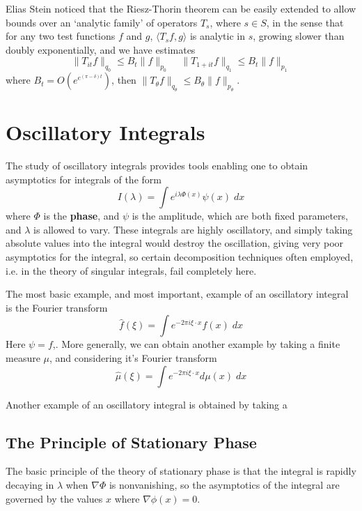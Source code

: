 Elias Stein noticed that the Riesz-Thorin theorem can be easily extended to allow bounds over an `analytic family' of operators $T_s$, where $s \in S$, in the sense that for any two test functions $f$ and $g$, $\langle T_s f, g \rangle$ is analytic in $s$, growing slower than doubly exponentially, and we have estimates
%
\[ \| T_{it} f \|_{q_0} \leq B_t \| f \|_{p_0}\ \ \ \ \ \| T_{1+it} f \|_{q_1} \leq B_t \| f \|_{p_1} \]
%
where $B_t = O(e^{e^{(\pi - \delta)t}})$, then $\| T_\theta f \|_{q_\theta} \leq B_\theta \| f \|_{p_\theta}$.

\chapter{Oscillatory Integrals}

The study of oscillatory integrals provides tools enabling one to obtain asymptotics for integrals of the form
%
\[ I(\lambda) = \int e^{i \lambda \Phi(x)} \psi(x)\; dx \]
%
where $\Phi$ is the {\bf phase}, and $\psi$ is the amplitude, which are both fixed parameters, and $\lambda$ is allowed to vary. These integrals are highly oscillatory, and simply taking absolute values into the integral would destroy the oscillation, giving very poor asymptotics for the integral, so certain decomposition techniques often employed, i.e. in the theory of singular integrals, fail completely here.

\begin{example}
	The most basic example, and most important, example of an oscillatory integral is the Fourier transform
	\[ \widehat{f}(\xi) = \int e^{- 2 \pi i \xi \cdot x} f(x)\; dx \]
	Here $\psi = f$,. More generally, we can obtain another example by taking a finite measure $\mu$, and considering it's Fourier transform
	\[ \widehat{\mu}(\xi) = \int e^{- 2\pi i \xi \cdot x} d\mu(x)\; dx \]

\end{example}

\begin{example}
	Another example of an oscillatory integral is obtained by taking a
\end{example}

\section{The Principle of Stationary Phase}

The basic principle of the theory of stationary phase is that the integral is rapidly decaying in $\lambda$ when $\nabla \Phi$ is nonvanishing, so the asymptotics of the integral are governed by the values $x$ where $\nabla \phi(x) = 0$.

